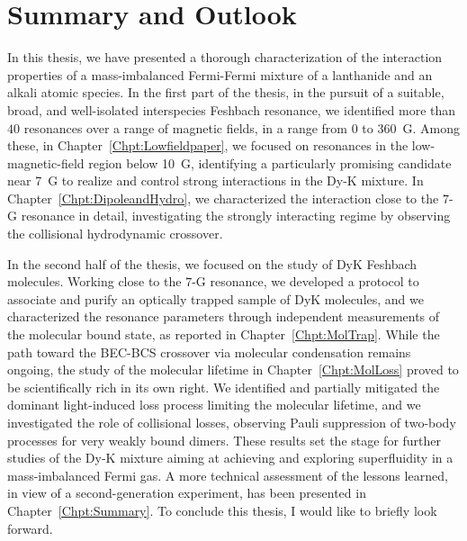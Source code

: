 \chapter{Summary and Outlook}
\label{Chpt:Outlook}


In this thesis, we have presented a thorough characterization of the interaction properties of a mass-imbalanced Fermi-Fermi mixture of a lanthanide and an alkali atomic species. In the first part of the thesis, in the pursuit of a suitable, broad, and well-isolated interspecies Feshbach resonance, we identified more than $40$ resonances over a range of magnetic fields, in a range from $0$ to \SI{360}{G}. Among these, in Chapter~\ref{Chpt:Lowfieldpaper}, we focused on resonances in the low-magnetic-field region below \SI{10}{G}, identifying a particularly promising candidate near \SI{7}{G} to realize and control strong interactions in the Dy-K mixture. In Chapter~\ref{Chpt:DipoleandHydro}, we characterized the interaction close to the $7$-G resonance in detail, investigating the strongly interacting regime by observing the collisional hydrodynamic crossover. 

In the second half of the thesis, we focused on the study of DyK Feshbach molecules. Working close to the $7$-G resonance, we developed a protocol to associate and purify an optically trapped sample of DyK molecules, and we characterized the resonance parameters through independent measurements of the molecular bound state, as reported in Chapter~\ref{Chpt:MolTrap}. While the path toward the \ac{BEC}-\ac{BCS} crossover via molecular condensation remains ongoing, the study of the molecular lifetime in Chapter~\ref{Chpt:MolLoss} proved to be scientifically rich in its own right. We identified and partially mitigated the dominant light-induced loss process limiting the molecular lifetime, and we investigated the role of collisional losses, observing Pauli suppression of two-body processes for very weakly bound dimers. %
These results set the stage for further studies of the Dy-K mixture aiming at achieving and exploring superfluidity in a mass-imbalanced Fermi gas. A more technical assessment of the lessons learned, in view of a second-generation experiment, has been presented in Chapter~\ref{Chpt:Summary}. To conclude this thesis, I would like to briefly look forward.

